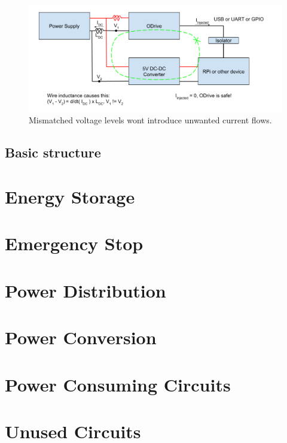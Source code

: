     \begin{figure}[h]
    \includegraphics[width=\textwidth]{contents/figures/ground_loop_fix.png}
    \caption{Mismatched voltage levels wont introduce unwanted current flows.}
    \label{ground_loop_fix}
    \end{figure}

    \clearpage
    \subsection{Basic structure}

    

    



\section{Energy Storage}

\section{Emergency Stop}

\section{Power Distribution}

\section{Power Conversion}

\section{Power Consuming Circuits}

\section{Unused Circuits}

